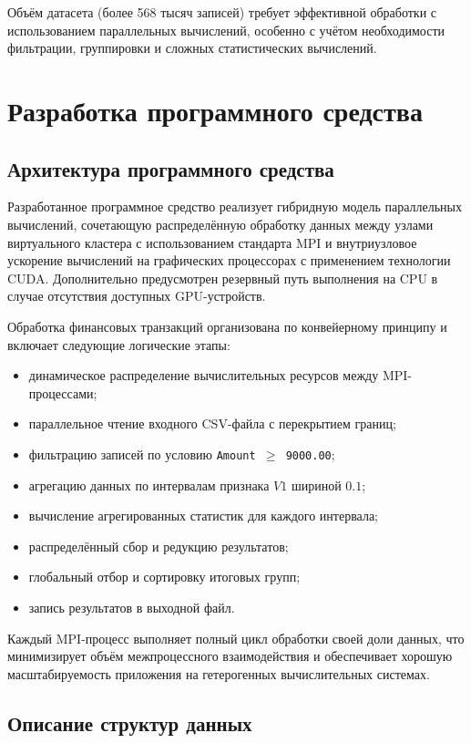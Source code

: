 \documentclass[areaset=advanced]{scrartcl}
\begin{document}
Объём датасета (более 568 тысяч записей) требует эффективной обработки с использованием параллельных вычислений, особенно с учётом необходимости фильтрации, группировки и сложных статистических вычислений.

\newpage
\section{Разработка программного средства}
\subsection{Архитектура программного средства}

Разработанное программное средство реализует гибридную модель параллельных
вычислений, сочетающую распределённую обработку данных между узлами
виртуального кластера с использованием стандарта MPI и внутриузловое
ускорение вычислений на графических процессорах с применением технологии CUDA.
Дополнительно предусмотрен резервный путь выполнения на CPU в случае отсутствия
доступных GPU-устройств.

Обработка финансовых транзакций организована по конвейерному принципу и
включает следующие логические этапы:
\begin{itemize}
  \item динамическое распределение вычислительных ресурсов между MPI-процессами;
  \item параллельное чтение входного CSV-файла с перекрытием границ;
  \item фильтрацию записей по условию \texttt{Amount $\geq$ 9000.00};
  \item агрегацию данных по интервалам признака $V1$ шириной $0.1$;
  \item вычисление агрегированных статистик для каждого интервала;
  \item распределённый сбор и редукцию результатов;
  \item глобальный отбор и сортировку итоговых групп;
  \item запись результатов в выходной файл.
\end{itemize}

Каждый MPI-процесс выполняет полный цикл обработки своей доли данных,
что минимизирует объём межпроцессного взаимодействия и обеспечивает хорошую
масштабируемость приложения на гетерогенных вычислительных системах.

\subsection{Описание структур данных}
\end{document}
